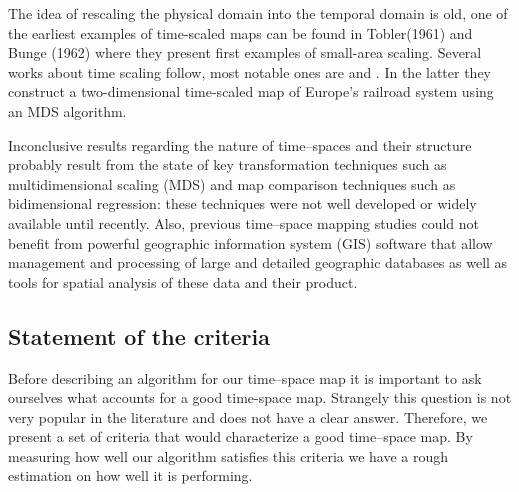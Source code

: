 \documentclass[a4paper,11pt]{article}
\begin{document}
The idea of rescaling the physical domain into the temporal domain is old, one of the earliest
examples of time-scaled maps can be found in Tobler(1961) and Bunge (1962) where they
present first examples of small-area scaling. Several works about time scaling follow, most
notable ones are  and . In the latter they
construct a two-dimensional time-scaled map of Europe's railroad system using an MDS
algorithm.

Inconclusive results regarding the nature of time--spaces and their structure probably result
from the state of key transformation techniques such as multidimensional scaling (MDS) and
map comparison techniques such as bidimensional regression: these techniques were not
well developed or widely available until recently. Also, previous time--space mapping studies
could not benefit from powerful geographic information system (GIS) software that allow management 
and processing of large and detailed geographic databases as well as tools for
spatial analysis of these data and their product.

\subsection{Statement of the criteria}
Before describing an algorithm for our time--space map it is important to ask ourselves
what accounts for a good time-space map. Strangely this question is not very popular in
the literature and does not have a clear answer. Therefore, we present a set of criteria that
would characterize a good time--space map. By measuring how well our algorithm satisfies
this criteria we have a rough estimation on how well it is performing.
\end{document}
